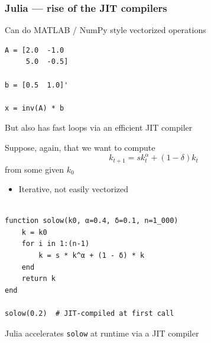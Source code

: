 \begin{frame}[fragile]
    \frametitle{Julia --- rise of the JIT compilers}

    Can do MATLAB / NumPy style vectorized operations

    \begin{verbatim}
A = [2.0  -1.0
     5.0  -0.5]

b = [0.5  1.0]'

x = inv(A) * b
    \end{verbatim}
    

    \vspace{0.5em}
    \vspace{0.5em}
    But also has fast loops via an efficient JIT compiler

\end{frame}


\begin{frame}
    
    \Eg Suppose, again, that we want to compute 
    \begin{equation*}
        k_{t+1} = s k_t^\alpha + (1 - \delta) k_t
    \end{equation*}
    from some given $k_0$ 


    \vspace{0.5em}
    \vspace{0.5em}
    \vspace{0.5em}
    \vspace{0.5em}
    \begin{itemize}
        \item Iterative, not easily vectorized
    \end{itemize}

\end{frame}


\begin{frame}[fragile]
    
    \begin{verbatim}

function solow(k0, α=0.4, δ=0.1, n=1_000)
    k = k0
    for i in 1:(n-1)
        k = s * k^α + (1 - δ) * k
    end
    return k
end

solow(0.2)  # JIT-compiled at first call
    \end{verbatim}

    \vspace{0.5em}
    \vspace{0.5em}
    \vspace{0.5em}
    \vspace{0.5em}

    Julia accelerates \texttt{solow} at runtime via a JIT compiler

\end{frame}


